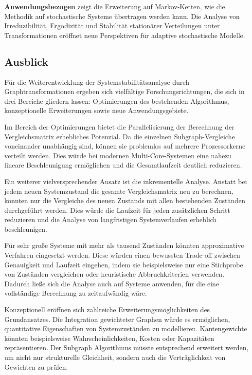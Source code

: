 \documentclass[a4paper,12pt]{article}
\theoremstyle{definition}
\begin{document}
\textbf{Anwendungsbezogen} zeigt die Erweiterung auf Markov-Ketten, wie die Methodik auf stochastische Systeme übertragen werden kann. Die Analyse von Irreduzibilität, Ergodizität und Stabilität stationärer Verteilungen unter Transformationen eröffnet neue Perspektiven für adaptive stochastische Modelle.

\subsection{Ausblick}

Für die Weiterentwicklung der Systemstabilitätsanalyse durch Graphtransformationen ergeben sich vielfältige Forschungsrichtungen, die sich in drei Bereiche gliedern lassen: Optimierungen des bestehenden Algorithmus, konzeptionelle Erweiterungen sowie neue Anwendungsgebiete.

Im Bereich der Optimierungen bietet die Parallelisierung der Berechnung der Vergleichsmatrix erhebliches Potenzial. Da die einzelnen Subgraph-Vergleiche voneinander unabhängig sind, können sie problemlos auf mehrere Prozessorkerne verteilt werden. Dies würde bei modernen Multi-Core-Systemen eine nahezu lineare Beschleunigung ermöglichen und die Gesamtlaufzeit deutlich reduzieren.

Ein weiterer vielversprechender Ansatz ist die inkrementelle Analyse. Anstatt bei jedem neuen Systemzustand die gesamte Vergleichsmatrix neu zu berechnen, könnten nur die Vergleiche des neuen Zustands mit allen bestehenden Zuständen durchgeführt werden. Dies würde die Laufzeit für jeden zusätzlichen Schritt reduzieren und die Analyse von langfristigen Systemverläufen erheblich beschleunigen.

Für sehr große Systeme mit mehr als tausend Zuständen könnten approximative Verfahren eingesetzt werden. Diese würden einen bewussten Trade-off zwischen Genauigkeit und Laufzeit eingehen, indem sie beispielsweise nur eine Stichprobe von Zuständen vergleichen oder heuristische Abbruchkriterien verwenden. Dadurch ließe sich die Analyse auch auf Systeme anwenden, für die eine vollständige Berechnung zu zeitaufwändig wäre.

Konzeptionell eröffnen sich zahlreiche Erweiterungsmöglichkeiten des Grundansatzes. Die Integration gewichteter Graphen würde es ermöglichen, quantitative Eigenschaften von Systemzuständen zu modellieren. Kantengewichte könnten beispielsweise Wahrscheinlichkeiten, Kosten oder Kapazitäten repräsentieren. Der Subgraph Algorithmus müsste entsprechend erweitert werden, um nicht nur strukturelle Gleichheit, sondern auch die Verträglichkeit von Gewichten zu prüfen.
\end{document}
